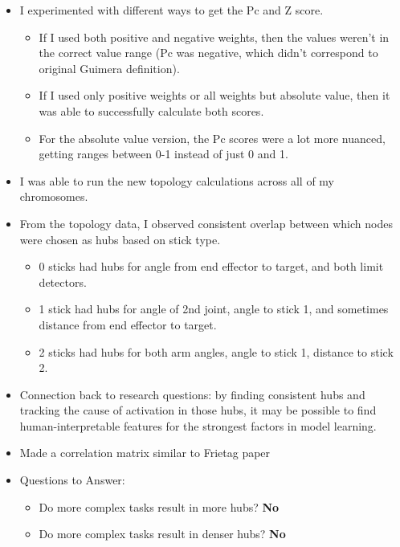 \documentclass{article}
\begin{document}
\begin{itemize}
\begin{itemize}
        \item For 2 sticks, using 100 trials instead of 10 harmed the reaches performance similar to the pattern observed for 1 stick.
    \end{itemize}
    \item I experimented with different ways to get the Pc and Z score. 
    \begin{itemize}
        \item If I used both positive and negative weights, then the values weren't in the correct value range (Pc was negative, which didn't correspond to original Guimera definition). 
        \item If I used only positive weights or all weights but absolute value, then it was able to successfully calculate both scores. 
        \item For the absolute value version, the Pc scores were a lot more nuanced, getting ranges between 0-1 instead of just 0 and 1. 
    \end{itemize}
    \item I was able to run the new topology calculations across all of my chromosomes. 
    \item From the topology data, I observed consistent overlap between  which nodes were chosen as hubs based on stick type. 
    \begin{itemize}
        \item 0 sticks had hubs for angle from end effector to target, and both limit detectors. 
        \item 1 stick had hubs for angle of 2nd joint, angle to stick 1, and sometimes distance from end effector to target. 
        \item 2 sticks had hubs for both arm angles, angle to stick 1, distance to stick 2.
    \end{itemize} 
    \item Connection back to research questions: by finding consistent hubs and tracking the cause of activation in those hubs, it may be possible to find human-interpretable features for the strongest factors in model learning.
    \item Made a correlation matrix similar to Frietag paper
    \item Questions to Answer:
    \begin{itemize}
        \item Do more complex tasks result in more hubs? \textbf{No}
        \item Do more complex tasks result in denser hubs? \textbf{No}

\end{itemize}
\end{itemize}
\end{document}
